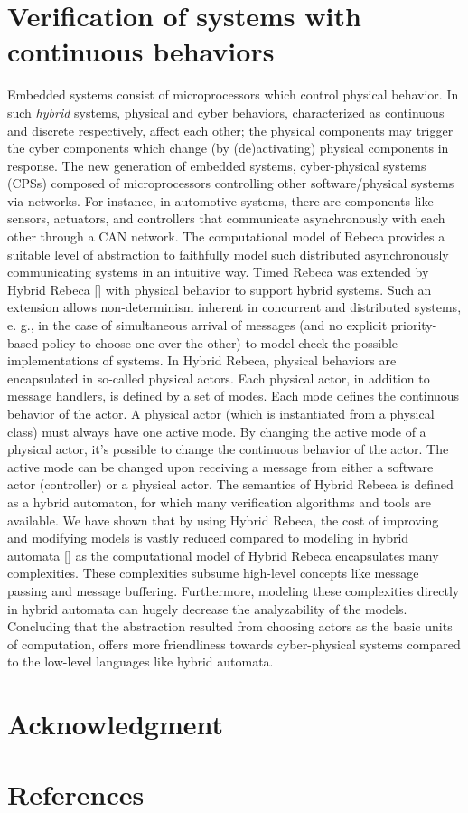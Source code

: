 \documentclass[conference]{IEEEtran}
\begin{document}
	\section{Verification of systems with continuous behaviors}
	Embedded systems consist of microprocessors which control physical behavior. In such \emph{hybrid} systems, physical and cyber behaviors, characterized as continuous and discrete respectively, affect each other; the physical components may trigger the cyber components which change (by (de)activating) physical components in response. The new generation of embedded systems, cyber-physical systems (CPSs) composed of microprocessors controlling other software/physical systems via networks. For instance, in automotive systems, there are components like sensors, actuators, and controllers that communicate asynchronously with each other through a CAN network. The computational model of Rebeca provides a suitable level of abstraction to faithfully model such distributed asynchronously communicating systems in an intuitive way.
	Timed Rebeca was extended by Hybrid Rebeca [] with physical behavior to support hybrid systems. Such an extension allows non-determinism inherent in concurrent and distributed systems, e. g., in the case of simultaneous arrival of messages (and no explicit priority-based policy to choose one over the other) to model check the possible implementations of systems. In Hybrid Rebeca, physical behaviors are encapsulated in so-called physical actors. Each physical actor, in addition to message handlers, is defined by a set of modes. Each mode defines the continuous behavior of the actor. A physical actor (which is instantiated from a physical class) must always have one active mode. By changing the active mode of a physical actor, it's possible to change the continuous behavior of the actor. The active mode can be changed upon receiving a message from either a software actor (controller) or a physical actor. The semantics of Hybrid Rebeca is defined as a hybrid automaton, for which many verification algorithms and tools are available. 
	We have shown that by using Hybrid Rebeca, the cost of improving and modifying models is vastly reduced compared to modeling in hybrid automata [] as the computational model of Hybrid Rebeca encapsulates many complexities. These complexities subsume high-level concepts like message passing and message buffering. Furthermore, modeling these complexities directly in hybrid automata can hugely decrease the analyzability of the models. Concluding that the abstraction resulted from choosing actors as the basic units of computation, offers more friendliness towards cyber-physical systems compared to the low-level languages like hybrid automata.
	
	
	
	\section*{Acknowledgment}
	\section*{References}
	
	
	
	
	
	
\end{document}
